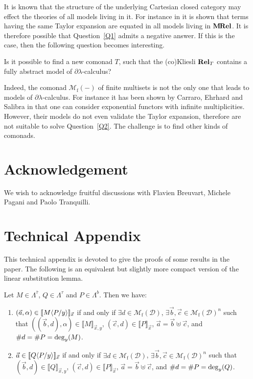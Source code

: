 \documentclass{LMCS}
\newcommand{\MRel}{\bold{M\hspace{-1pt}Rel}}
\newcommand{\dlam}{\ensuremath{\partial\lambda}}
\newcommand{\Set}[1]{\Lambda^{#1}}
\newcommand{\Int}[1]{\llbracket #1\rrbracket} \newcommand{\trm}[1]{#1^{\textrm{--}}}
\newcommand{\Mfin}[1]{\mathcal{M}_{\mathrm{f}}(#1)}
\newcommand{\mcup}{\uplus}
\newcommand{\seq}[1]{\vec{#1}}
\newcommand{\gt}{\ensuremath{\tau}}
\newcommand{\gto}{\ensuremath{\bar\tau}}
\newcommand{\cD}{\mathcal{D}}
\begin{document}
It is known that the structure of the underlying Cartesian closed category may effect the theories of all models living in it.
For instance in \cite{Manzonetto10} it is shown that terms having the same Taylor expansion are equated in all models living in $\MRel$.
It is therefore possible that Question~\ref{Q1} admits a negative answer.
If this is the case, then the following question becomes interesting.

\begin{qu}\label{Q2} Is it possible to find a new comonad $T$, such that the (co)Kliesli $\bold{Rel}_T$ contains a fully abstract model of \dlam-calculus?
\end{qu}

Indeed, the comonad $\Mfin{-}$ of finite multisets is not the only one that leads to models of \dlam-calculus.
For instance it has been shown by Carraro, Ehrhard and Salibra in \cite{CarraroES10b} that one can consider exponential functors with infinite multiplicities. 
However, their models do not even validate the Taylor expansion, therefore are not suitable to solve Question~\ref{Q2}.
The challenge is to find other kinds of comonads.
 
\section*{Acknowledgement}
We wish to acknowledge fruitful discussions with Flavien Breuvart, Michele Pagani and Paolo Tranquilli.




\newpage
\appendix
\section{Technical Appendix}\label{app:tech_app}

This technical appendix is devoted to give the proofs of some results in the paper.
The following is an equivalent but slightly more compact version of the linear substitution lemma.

\begin{lem}
Let $M \in\Set{\gto}$, $Q\in\Set{\gt}$ and $P\in\Set{b}$. Then we have:
\begin{enumerate}[\em(i)]
\item $(\seq a,\alpha)\in \Int{M\lsubst{y}{P}}_{\seq x}$ if and only if 
	$\exists d \in \Mfin{\cD}$, $\exists \seq b,\seq c \in \Mfin{\cD}^n$ such that
        $((\seq b,d),\alpha) \in \Int{M}_{\seq x,y}$,
        $(\seq c,d) \in \Int{P}_{\seq x}$,  
        $\seq a = \seq b \mcup \seq c$, and 
        $\# d = \# P = \mathrm{deg}_{y}(M)$.
\item $\seq a \in \Int{Q\lsubst{y}{P}}_{\seq x}$ if and only if 
	$\exists d \in \Mfin{\cD}$, $\exists \seq b,\seq c \in \Mfin{\cD}^n$ such that
        $(\seq b,d) \in \Int{Q}_{\seq x,y}$,
        $(\seq c,d) \in \Int{P}_{\seq x}$,  
        $\seq a = \seq b \mcup \seq c$, and 
        $\# d = \# P = \mathrm{deg}_{y}(Q)$.
\end{enumerate}
\end{lem}
\end{document}
